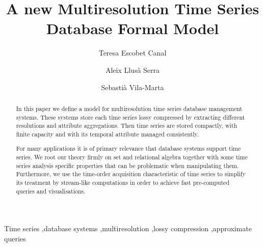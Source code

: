 \documentclass[
  review,
  twocolumn,
  5p,
]{elsarticle}
\begin{document}


\begin{frontmatter}

  \title{A new Multiresolution Time Series \\ Database Formal Model}

  \author
  [dipse]
  {Teresa Escobet Canal
}

  \author
  [dipse]
  {Aleix Llus\`{a} Serra
  }

  \author
  [dipse]
  {Sebasti\`{a} Vila-Marta
  }

  \address
  [dipse]
  {Department of Electronic System Design and Programming\\ Universitat Polit\`{e}cnica de Catalunya\\ Av.~Bases de Manresa 61--73, 08242 Manresa, ES-CT}

 


  \begin{abstract}
    In this paper we define a model for multiresolution time series
    database management systems. These systems store each time series
    lossy compressed by extracting different resolutions and attribute
    aggregations. Then time series are stored compactly, with finite
    capacity and with its temporal attribute managed consistently.

    For many applications it is of primary relevance that database
    systems support time series.  We root our theory firmly on set and
    relational algebra together with some time series analysis
    specific properties that can be problematic when manipulating
    them.  Furthermore, we use the time-order acquisition
    characteristic of time series to simplify its treatment by
    stream-like computations in order to achieve fast pre-computed
    queries and visualisations.
  \end{abstract}



  \begin{keyword}
    Time series \sep database systems \sep multiresolution \sep lossy
    compression \sep approximate queries
  \end{keyword}

\end{frontmatter}
\end{document}
